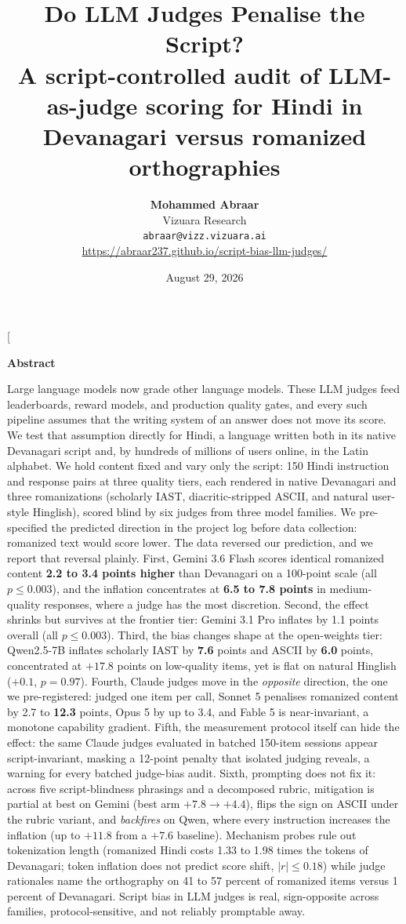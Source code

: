 \documentclass[10pt,twocolumn]{article}
\title{\textbf{Do LLM Judges Penalise the Script?\\
\large A script-controlled audit of LLM-as-judge scoring for Hindi in Devanagari versus romanized orthographies}}
\author{\textbf{Mohammed Abraar}\\ Vizuara Research\\ \small \texttt{abraar@vizz.vizuara.ai}\\ \small \url{https://abraar237.github.io/script-bias-llm-judges/}}
\date{August 29, 2026}
\begin{document}
\twocolumn[{
\maketitle
\begin{center}\begin{minipage}{0.86\textwidth}
\small
\begin{center}\textbf{Abstract}\end{center}
\noindent Large language models now grade other language models. These LLM judges feed leaderboards, reward models, and production quality gates, and every such pipeline assumes that the writing system of an answer does not move its score. We test that assumption directly for Hindi, a language written both in its native Devanagari script and, by hundreds of millions of users online, in the Latin alphabet. We hold content fixed and vary only the script: 150 Hindi instruction and response pairs at three quality tiers, each rendered in native Devanagari and three romanizations (scholarly IAST, diacritic-stripped ASCII, and natural user-style Hinglish), scored blind by six judges from three model families. We pre-specified the predicted direction in the project log before data collection: romanized text would score lower. The data reversed our prediction, and we report that reversal plainly. First, Gemini 3.6 Flash scores identical romanized content \textbf{2.2 to 3.4 points higher} than Devanagari on a 100-point scale (all $p \le 0.003$), and the inflation concentrates at \textbf{6.5 to 7.8 points} in medium-quality responses, where a judge has the most discretion. Second, the effect shrinks but survives at the frontier tier: Gemini 3.1 Pro inflates by 1.1 points overall (all $p \le 0.003$). Third, the bias changes shape at the open-weights tier: Qwen2.5-7B inflates scholarly IAST by \textbf{7.6} points and ASCII by \textbf{6.0} points, concentrated at $\mathbf{+17.8}$ points on low-quality items, yet is flat on natural Hinglish ($+0.1$, $p = 0.97$). Fourth, Claude judges move in the \emph{opposite} direction, the one we pre-registered: judged one item per call, Sonnet 5 penalises romanized content by 2.7 to \textbf{12.3} points, Opus 5 by up to 3.4, and Fable 5 is near-invariant, a monotone capability gradient. Fifth, the measurement protocol itself can hide the effect: the same Claude judges evaluated in batched 150-item sessions appear script-invariant, masking a 12-point penalty that isolated judging reveals, a warning for every batched judge-bias audit. Sixth, prompting does not fix it: across five script-blindness phrasings and a decomposed rubric, mitigation is partial at best on Gemini (best arm $+7.8 \to +4.4$), flips the sign on ASCII under the rubric variant, and \emph{backfires} on Qwen, where every instruction increases the inflation (up to $+11.8$ from a $+7.6$ baseline). Mechanism probes rule out tokenization length (romanized Hindi costs 1.33 to 1.98 times the tokens of Devanagari; token inflation does not predict score shift, $|r| \le 0.18$) while judge rationales name the orthography on 41 to 57 percent of romanized items versus 1 percent of Devanagari. Script bias in LLM judges is real, sign-opposite across families, protocol-sensitive, and not reliably promptable away.

\end{minipage}
\end{center}}
\end{document}
